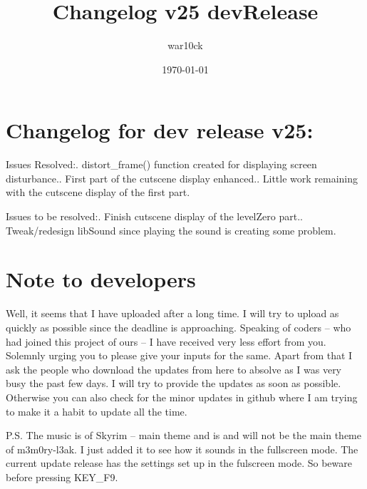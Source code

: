 \documentclass[a4paper]{article}
\begin{document}
\title{Changelog v25 devRelease}	%
\author{war10ck}	%
\date{\today}
\maketitle

\section{Changelog for dev release v25:}
Issues Resolved:. distort\_frame() function created for displaying screen disturbance.. First part of the cutscene display enhanced.. Little work remaining with the cutscene display of the first part.\newline 

Issues to be resolved:. Finish cutscene display of the levelZero part.. Tweak/redesign libSound since playing the sound is creating some problem.\newline

\section{Note to developers}
Well, it seems that I have uploaded after a long time. I will try to upload as quickly as possible since the deadline is approaching. Speaking of coders -- who had joined this project of ours -- I have received very less effort from you. Solemnly urging you to please give your inputs for the same. Apart from that I ask the people who download the updates from here to absolve as I was very busy the past few days. I will try to provide the updates as soon as possible. Otherwise you can also check for the minor updates in github where I am trying to make it a habit to update all the time.\newline

P.S. The music is of Skyrim -- main theme and is and will not be the main theme of m3m0ry-l3ak. I just added it to see how it sounds in the fullscreen mode. The current update release has the settings set up in the fulscreen mode. So beware before pressing KEY\_F9.\newline

\pagebreak
\end{document}
